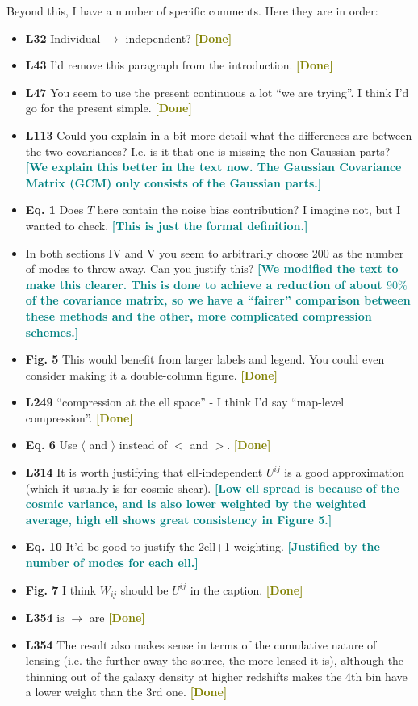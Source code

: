 \documentclass{article}
\newcommand\reply[1]{{\bf {\textcolor{teal}{[#1]}}}}
\newcommand\done{{\bf {\textcolor{olive}{[Done]}}}}
\begin{document}
	Beyond this, I have a number of specific comments. Here they are in order:
	\begin{itemize}
	\item \textbf{L32} Individual $\rightarrow$ independent? \done
	\item \textbf{L43} I'd remove this paragraph from the introduction. \done
	\item \textbf{L47} You seem to use the present continuous a lot “we are trying”. I think I'd go for the present simple. \done
	\item \textbf{L113} Could you explain in a bit more detail what the differences are between the two covariances? I.e. is it that one is missing the non-Gaussian parts? \reply{We explain this better in the text now. The Gaussian Covariance Matrix (GCM) only consists of the Gaussian parts.}
	\item \textbf{Eq. 1} Does $T$ here contain the noise bias contribution? I imagine not, but I wanted to check. \reply{This is just the formal definition.}
	\item In both sections IV and V you seem to arbitrarily choose 200 as the number of modes to throw away. Can you justify this? \reply{We modified the text to make this clearer. This is done to achieve a reduction of about $90\%$ of the covariance matrix, so we have a “fairer” comparison between these methods and the other, more complicated compression schemes.}
	\item \textbf{Fig. 5} This would benefit from larger labels and legend. You could even consider making it a double-column figure. \done
	\item \textbf{L249} “compression at the ell space” - I think I'd say “map-level compression”. \done
	\item \textbf{Eq. 6} Use $\langle$ and $\rangle$ instead of $<$ and $>$. \done
	\item \textbf{L314} It is worth justifying that ell-independent $U^{ij}$ is a good approximation (which it usually is for cosmic shear). \reply{Low ell spread is because of the cosmic variance, and is also lower weighted by the weighted average, high ell shows great consistency in Figure 5.}
	\item \textbf{Eq. 10} It'd be good to justify the 2ell+1 weighting. \reply{Justified by the number of modes for each ell.}
	\item \textbf{Fig. 7} I think $W_{ij}$ should be $U^{ij}$ in the caption. \done
	\item \textbf{L354} is $\rightarrow$ are \done
	\item \textbf{L354} The result also makes sense in terms of the cumulative nature of lensing (i.e. the further away the source, the more lensed it is), although the thinning out of the galaxy density at higher redshifts makes the 4th bin have a lower weight than the 3rd one. \done

\end{itemize}
\end{document}
